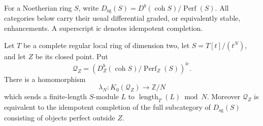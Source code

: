 For a Noetherian ring \(S\), write
\(D_{\mathrm{sg}}(S)=D^b(\operatorname{coh}S)/\operatorname{Perf}(S)\).
All categories below carry their usual differential graded, or equivalently
stable, enhancements.  A superscript \(\mathrm{ic}\) denotes idempotent
completion.

\begin{lemma}\label{lem:singular-monic-supported-length}
Let \(T\) be a complete regular local ring of dimension two, let
\(S=T[t]/(t^N)\), and let \(Z\) be its closed point.  Put
\[
 \mathcal Q_Z=
 \left(D^b_Z(\operatorname{coh}S)/\operatorname{Perf}_Z(S)\right)^{\mathrm{ic}}.
\]
There is a homomorphism
\[
 \lambda_N:K_0(\mathcal Q_Z)\longrightarrow\mathbb Z/N
\]
which sends a finite-length \(S\)-module \(L\) to
\(\operatorname{length}_T(L)\bmod N\).
Moreover \(\mathcal Q_Z\) is equivalent to the idempotent completion
of the full subcategory of \(D_{\mathrm{sg}}(S)\) consisting of objects
perfect outside \(Z\).
\end{lemma}

